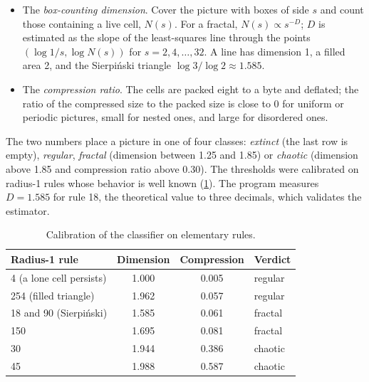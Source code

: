 \begin{itemize}
    \item The \emph{box-counting dimension}. Cover the picture with boxes of side $s$ and count
          those containing a live cell, $N(s)$. For a fractal, $N(s) \propto s^{-D}$; $D$ is estimated
          as the slope of the least-squares line through the points $(\log 1/s, \log N(s))$ for
          $s = 2, 4, \dots, 32$. A line has dimension 1, a filled area 2, and the Sierpi\'nski triangle
          $\log 3 / \log 2 \approx 1.585$.
    \item The \emph{compression ratio}. The cells are packed eight to a byte and deflated; the
          ratio of the compressed size to the packed size is close to 0 for uniform or periodic
          pictures, small for nested ones, and large for disordered ones.
\end{itemize}

The two numbers place a picture in one of four classes: \emph{extinct} (the last row is empty),
\emph{regular}, \emph{fractal} (dimension between 1.25 and 1.85) or \emph{chaotic} (dimension
above 1.85 and compression ratio above 0.30). The thresholds were calibrated on radius-1 rules
whose behavior is well known (\cref{tab:calibration}). The program measures $D = 1.585$ for rule
18, the theoretical value to three decimals, which validates the estimator.

\begin{table}[H]
    \centering\small
    \begin{tabular}{@{}lccl@{}}
        \toprule
        Radius-1 rule            & Dimension & Compression & Verdict \\
        \midrule
        4 (a lone cell persists) & 1.000     & 0.005       & regular \\
        254 (filled triangle)    & 1.962     & 0.057       & regular \\
        18 and 90 (Sierpi\'nski) & 1.585     & 0.061       & fractal \\
        150                      & 1.695     & 0.081       & fractal \\
        30                       & 1.944     & 0.386       & chaotic \\
        45                       & 1.988     & 0.587       & chaotic \\
        \bottomrule
    \end{tabular}
    \caption{Calibration of the classifier on elementary rules.}
    \label{tab:calibration}
\end{table}

